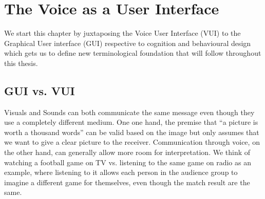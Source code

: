























\chapter{The Voice as a User Interface} 
\label{vui}


We start this chapter by juxtaposing the Voice User Interface (VUI) to the Graphical User interface (GUI) respective to cognition and behavioural design which gets us to define new terminological foundation that will follow throughout this thesis.

\section{GUI vs. VUI}
\label{guivsvui}

Visuals and Sounds can both communicate the same message even though they use a  completely different medium. One one hand, the premise that ``a picture is worth a thousand words'' can be valid based on the image but only assumes that we want to give a clear picture to the receiver. Communication through voice, on the other hand, can generally allow more room for interpretation. We think of watching a football game on TV vs. listening to the same game on radio as an example, where listening to it allows each person in the audience group to imagine a different game for themselves, even though the match result are the same.


